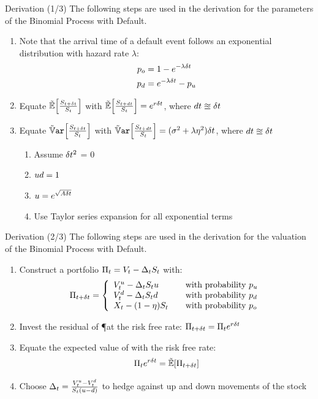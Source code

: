 \documentclass{beamer}
\begin{document}
\begin{frame}{Derivation (1/3)}
The following steps are used in the derivation for the parameters of the Binomial Process with Default.
\begin{enumerate}
 \item Note that the arrival time of a default event follows an exponential distribution with hazard rate $\lambda$:
       \begin{align}
        p_o &= 1 - e^{-\lambda\delta t} \\
        p_d &= e^{-\lambda\delta t} - p_u
       \end{align}
 \item Equate $\E[\frac{\SDt}{\S}]$ with $\E[\frac{\Sdt}{\S}] = e^{r\Dt}$, where $dt \approxeq \delta t$
 \item Equate $\Var[\frac{\SDt}{\S}]$ with $\Var[\frac{\Sdt}{\S}] = (\sigma^2 + \lambda\eta^2)\Dt$, where $dt \approxeq \delta t$
       \begin{enumerate}
        \item Assume $\delta t^2$ = 0
        \item $ud = 1$
        \item $u = e^{\sqrt{A\delta t}}$
        \item Use Taylor series expansion for all exponential terms
       \end{enumerate}
\end{enumerate}
\end{frame}

\begin{frame}{Derivation (2/3)}
The following steps are used in the derivation for the valuation of the Binomial Process with Default.
\begin{enumerate}
 \item Construct a portfolio $\Pi_t = V_t - \Delta_tS_t$ with:
       \begin{equation}
        \PDt = \left\{
                \begin{array}{l@{\qquad\mbox{with probability }}l}
                 \Vu - \D\S\u      & \pu \\
                 \Vd - \D\S\d      & \pd \\
                 \X - (1 - \eta)\S & \po
                \end{array}\right.
       \end{equation}
 \item Invest the residual of \P at the risk free rate: $\Pi_{t + \delta t} = \Pi_t e^{r\delta t}$
 \item Equate the expected value of \PDt with the risk free rate:
       \begin{align}
        \P e^{r\Dt} = \E[\PDt]
       \end{align}
 \item Choose $\Delta_t = \frac{V^{u}_t - V^{d}_t}{S_t(u - d)}$ to hedge against up and down movements of the stock
\end{enumerate}
\end{frame}
\end{document}
